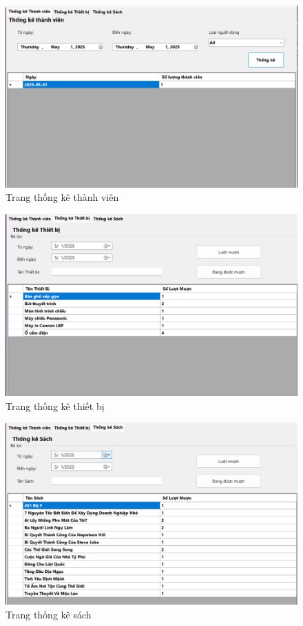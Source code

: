 \documentclass{article}
\begin{document}
\begin{figure}
    \centering
    \includegraphics[width=1\linewidth]{images//Winform/page thống kê tv.png}
    \caption{Trang thống kê thành viên}
    \label{fig:enter-label}
\end{figure}

\begin{figure} [H]
    \centering
    \includegraphics[width=1\linewidth]{images//Winform/page thống kê tb.png}
    \caption{Trang thống kê thiết bị}
    \label{fig:enter-label}
\end{figure}

\begin{figure} [H]
    \centering
    \includegraphics[width=1\linewidth]{images//Winform/page thống kê sách.png}
    \caption{Trang thống kê sách}
    \label{fig:enter-label}
\end{figure}
\end{document}
